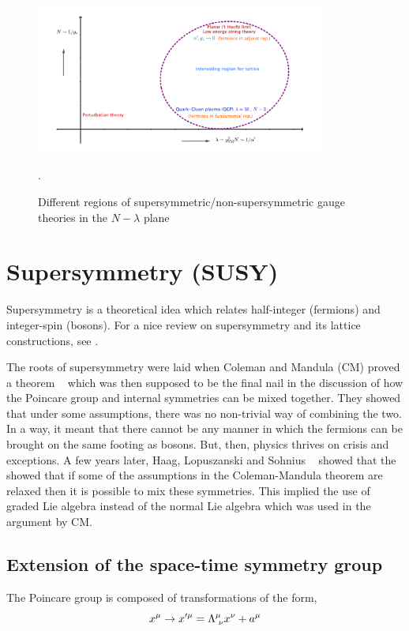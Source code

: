 \begin{figure}
\begin{center}\includegraphics[width=0.85\textwidth]{./Figures/N_lam_phase.pdf}\end{center}
\caption{\label{fig:Nlam1}Different regions of supersymmetric/non-supersymmetric gauge theories in the $N-\lambda$ plane}. 
\end{figure}

\section{Supersymmetry (SUSY)}

Supersymmetry is a theoretical idea which relates half-integer (fermions) and
integer-spin (bosons). For a nice review on supersymmetry and its lattice constructions, 
see \cite{Argyres:2001eva, Seiberg:1997ax, Catterall:2009it}. 

The roots of supersymmetry were laid when Coleman and Mandula (CM) proved a theorem ~\cite{Coleman:1967ad} 
which was then supposed to be the final nail in the discussion of how the Poincare group and internal symmetries can 
be mixed together. 
They showed that under some assumptions, there was no non-trivial way of combining the two. In a way, it meant that 
there cannot be any manner in which the fermions can be brought on the same footing as bosons. But, then, physics 
thrives on crisis and exceptions. A few years later, Haag, Lopuszanski and Sohnius ~\cite{Haag:1974qh} showed that the 
showed that if some of the assumptions in the Coleman-Mandula theorem are relaxed then it is possible to mix these symmetries. 
This implied the use of graded Lie algebra instead of the normal Lie algebra which was used in the argument by CM.  


\subsection{Extension of the space-time symmetry group} 
The Poincare group is composed of transformations of the form, 
\begin{equation}
x^{\mu} \rightarrow x^{\prime \mu} = \Lambda^{\mu}_{\hspace{1mm} \nu} x^{\nu} + a^{\mu}
\end{equation}

